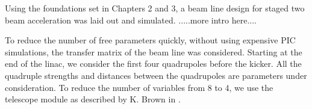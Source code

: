 Using the foundations set in Chapters 2 and 3, a beam line design for staged 
two beam acceleration was laid out and simulated. 
.....more intro here....

 To reduce the number of free parameters quickly, without using expensive PIC simulations, 
 the transfer matrix of the beam line was considered. Starting at the end of the linac, 
 we consider the first four quadrupoles before the kicker. All the quadruple strengths and
 distances between the quadrupoles are parameters under consideration. To reduce the number
 of variables from 8 to 4, we use the telescope module as described by K. Brown in \cite{brown}.   